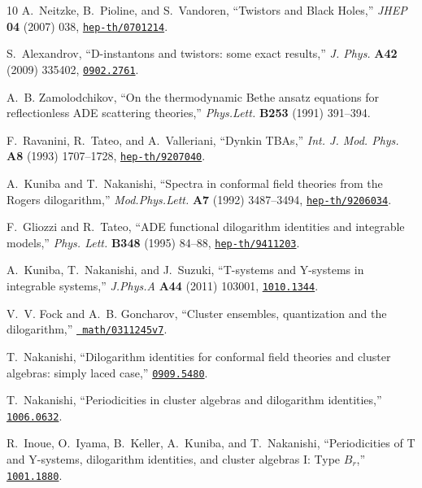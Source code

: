 \documentclass[12pt,reqno]{article}
\numberwithin{equation}{section}
\numberwithin{equation}{section}
\begin{document}
\begin{thebibliography}{10}
A.~Neitzke, B.~Pioline, and S.~Vandoren, ``{Twistors and Black Holes},'' {\em
  JHEP} {\bf 04} (2007) 038,
\href{http://www.arXiv.org/abs/hep-th/0701214}{{\tt hep-th/0701214}}.

S.~Alexandrov, ``{D-instantons and twistors: some exact results},'' {\em J.
  Phys.} {\bf A42} (2009) 335402,
\href{http://www.arXiv.org/abs/0902.2761}{{\tt 0902.2761}}.

A.~B. Zamolodchikov, ``{On the thermodynamic Bethe ansatz equations for
  reflectionless ADE scattering theories},'' {\em Phys.Lett.} {\bf B253} (1991)
  391--394.

F.~Ravanini, R.~Tateo, and A.~Valleriani, ``{Dynkin TBAs},'' {\em Int. J. Mod.
  Phys.} {\bf A8} (1993) 1707--1728,
\href{http://www.arXiv.org/abs/hep-th/9207040}{{\tt hep-th/9207040}}.

A.~Kuniba and T.~Nakanishi, ``{Spectra in conformal field theories from the
  Rogers dilogarithm},'' {\em Mod.Phys.Lett.} {\bf A7} (1992) 3487--3494,
  \href{http://www.arXiv.org/abs/hep-th/9206034}{{\tt hep-th/9206034}}.

F.~Gliozzi and R.~Tateo, ``{ADE functional dilogarithm identities and
  integrable models},'' {\em Phys. Lett.} {\bf B348} (1995) 84--88,
\href{http://www.arXiv.org/abs/hep-th/9411203}{{\tt hep-th/9411203}}.

A.~Kuniba, T.~Nakanishi, and J.~Suzuki, ``{T-systems and Y-systems in
  integrable systems},'' {\em J.Phys.A} {\bf A44} (2011) 103001,
  \href{http://www.arXiv.org/abs/1010.1344}{{\tt 1010.1344}}.

V.~V. Fock and A.~B. Goncharov, ``Cluster ensembles, quantization and the
  dilogarithm,'' \href{http://www.arXiv.org/abs/math/0311245v7}{{\tt
  math/0311245v7}}.

T.~Nakanishi, ``{Dilogarithm identities for conformal field theories and
  cluster algebras: simply laced case},''
  \href{http://www.arXiv.org/abs/0909.5480}{{\tt 0909.5480}}.

T.~Nakanishi, ``{Periodicities in cluster algebras and dilogarithm
  identities},'' \href{http://www.arXiv.org/abs/1006.0632}{{\tt 1006.0632}}.

R.~Inoue, O.~Iyama, B.~Keller, A.~Kuniba, and T.~Nakanishi, ``{Periodicities of
  T and Y-systems, dilogarithm identities, and cluster algebras I: Type
  $B_r$},''
\href{http://www.arXiv.org/abs/1001.1880}{{\tt 1001.1880}}.


\end{thebibliography}
\end{document}
